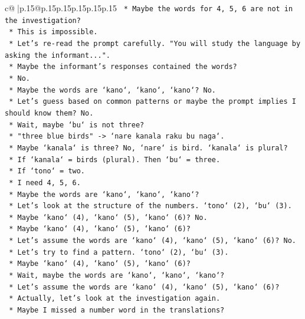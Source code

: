 \documentclass{article}
\begin{document}
{\begin{supertabular}{c@{$\;$}|p{.15\linewidth}@{}p{.15\linewidth}p{.15\linewidth}p{.15\linewidth}p{.15\linewidth}p{.15\linewidth}}
{{{\texttt{        *   Maybe the words for 4, 5, 6 are not in the investigation?} \\
\texttt{        *   This is impossible.} \\
\texttt{        *   Let's re{-}read the prompt carefully. "You will study the language by asking the informant...".} \\
\texttt{        *   Maybe the informant's responses contained the words?} \\
\texttt{        *   No.} \\
\texttt{        *   Maybe the words are `kano`, `kano`, `kano`? No.} \\
\texttt{        *   Let's guess based on common patterns or maybe the prompt implies I should know them? No.} \\
\texttt{        *   Wait, maybe `bu` is not three?} \\
\texttt{        *   "three blue birds" {-}> `nare kanala raku bu naga`.} \\
\texttt{        *   Maybe `kanala` is three? No, `nare` is bird. `kanala` is plural?} \\
\texttt{        *   If `kanala` = birds (plural). Then `bu` = three.} \\
\texttt{        *   If `tono` = two.} \\
\texttt{        *   I need 4, 5, 6.} \\
\texttt{        *   Maybe the words are `kano`, `kano`, `kano`?} \\
\texttt{        *   Let's look at the structure of the numbers. `tono` (2), `bu` (3).} \\
\texttt{        *   Maybe `kano` (4), `kano` (5), `kano` (6)? No.} \\
\texttt{        *   Maybe `kano` (4), `kano` (5), `kano` (6)?} \\
\texttt{        *   Let's assume the words are `kano` (4), `kano` (5), `kano` (6)? No.} \\
\texttt{        *   Let's try to find a pattern. `tono` (2), `bu` (3).} \\
\texttt{        *   Maybe `kano` (4), `kano` (5), `kano` (6)?} \\
\texttt{        *   Wait, maybe the words are `kano`, `kano`, `kano`?} \\
\texttt{        *   Let's assume the words are `kano` (4), `kano` (5), `kano` (6)?} \\
\texttt{        *   Actually, let's look at the investigation again.} \\
\texttt{        *   Maybe I missed a number word in the translations?} \\
}}}
\end{supertabular}}
\end{document}
